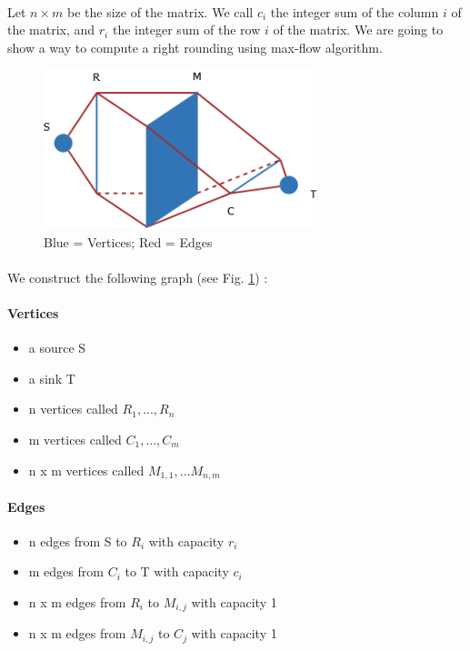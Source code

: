 \paragraph{} 
Let $n\times m$ be the size of the matrix. We call $c_i$ the integer sum of the column $i$ of the matrix, and $r_i$ the integer sum of the row $i$ of the matrix. We are going to show a way to compute a right rounding using max-flow algorithm.

\begin{figure}[h]
	\centering
		\includegraphics[width=8cm]{Diagramme1.png}
	\caption{Blue = Vertices; Red = Edges}
	\label{fig:Diagramme1}
\end{figure}

\paragraph{}
We construct the following graph (see Fig. \ref{fig:Diagramme1}) :
\paragraph{Vertices}
\begin{itemize}
\item a source S
\item a sink T
\item n vertices called $R_1,...,R_n$
\item m vertices called $C_1,...,C_m$
\item n x m vertices called $M_{1,1},...M_{n,m}$
\end{itemize}

\paragraph{Edges}
\begin{itemize}
\item n edges from S to $R_i$ with capacity $r_i$
\item m edges from $C_i$ to T with capacity $c_i$
\item n x m edges from $R_i$ to $M_{i,j}$ with capacity 1
\item n x m edges from $M_{i,j}$ to $C_j$ with capacity 1
\end{itemize}

